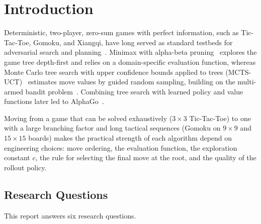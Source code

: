 \section{Introduction}
\label{sec:introduction}

Deterministic, two-player, zero-sum games with perfect information, such as Tic-Tac-Toe, Gomoku, and Xiangqi, have long served as standard testbeds for adversarial search and planning~\cite{knuth1975analysis,allis1994searching}. Minimax with alpha-beta pruning~\cite{knuth1975analysis} explores the game tree depth-first and relies on a domain-specific evaluation function, whereas Monte Carlo tree search with upper confidence bounds applied to trees (MCTS-UCT)~\cite{kocsis2006bandit,browne2012survey} estimates move values by guided random sampling, building on the multi-armed bandit problem~\cite{auer2002finite}. Combining tree search with learned policy and value functions later led to AlphaGo~\cite{silver2016mastering}.

Moving from a game that can be solved exhaustively ($3\times 3$ Tic-Tac-Toe) to one with a large branching factor and long tactical sequences (Gomoku on $9\times 9$ and $15\times 15$ boards) makes the practical strength of each algorithm depend on engineering choices: move ordering, the evaluation function, the exploration constant $c$, the rule for selecting the final move at the root, and the quality of the rollout policy.

\subsection{Research Questions}
\label{subsec:rqs}

This report answers six research questions.

